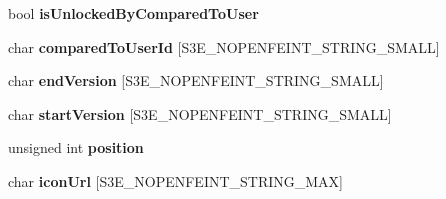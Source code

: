 \begin{DoxyCompactItemize}
\item 
\hypertarget{group___n_open_feint_api_group_ga71acb5cdd5292a7b5083c326c714dcb4}{
bool {\bfseries isUnlockedByComparedToUser}}
\label{group___n_open_feint_api_group_ga71acb5cdd5292a7b5083c326c714dcb4}

\item 
\hypertarget{group___n_open_feint_api_group_gaa92898686eac33f624185167d5375516}{
char {\bfseries comparedToUserId} \mbox{[}S3E\_\-NOPENFEINT\_\-STRING\_\-SMALL\mbox{]}}
\label{group___n_open_feint_api_group_gaa92898686eac33f624185167d5375516}

\item 
\hypertarget{group___n_open_feint_api_group_ga8ed42d00785e6c909036c72d72a23a98}{
char {\bfseries endVersion} \mbox{[}S3E\_\-NOPENFEINT\_\-STRING\_\-SMALL\mbox{]}}
\label{group___n_open_feint_api_group_ga8ed42d00785e6c909036c72d72a23a98}

\item 
\hypertarget{group___n_open_feint_api_group_ga5e75b58191771edc32ebf022277b85cd}{
char {\bfseries startVersion} \mbox{[}S3E\_\-NOPENFEINT\_\-STRING\_\-SMALL\mbox{]}}
\label{group___n_open_feint_api_group_ga5e75b58191771edc32ebf022277b85cd}

\item 
\hypertarget{group___n_open_feint_api_group_gabdadc0c884c55313c7fc0ee1067f4b8a}{
unsigned int {\bfseries position}}
\label{group___n_open_feint_api_group_gabdadc0c884c55313c7fc0ee1067f4b8a}

\item 
\hypertarget{group___n_open_feint_api_group_ga3a1eb47a42bd1867f223a1ae7f076b40}{
char {\bfseries iconUrl} \mbox{[}S3E\_\-NOPENFEINT\_\-STRING\_\-MAX\mbox{]}}
\label{group___n_open_feint_api_group_ga3a1eb47a42bd1867f223a1ae7f076b40}

\end{DoxyCompactItemize}


